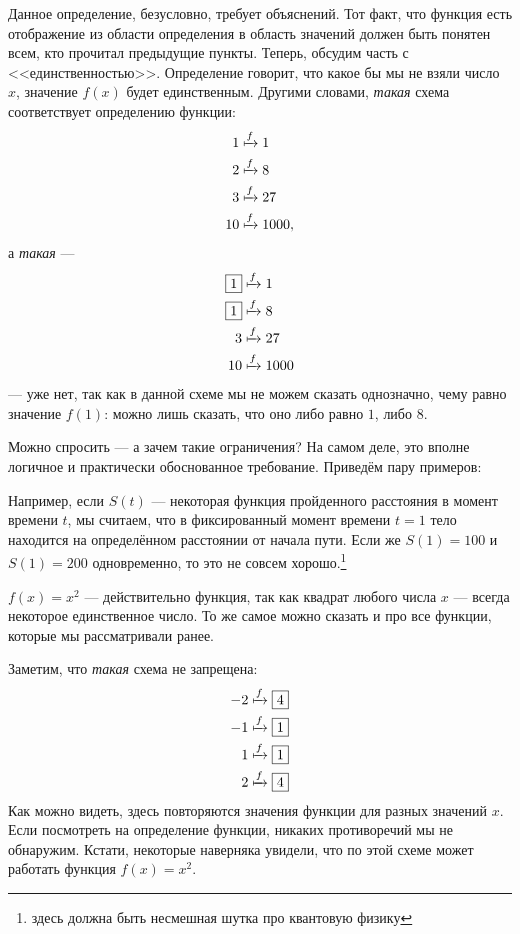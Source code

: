 \documentclass[11pt,fleqn]{book} %
\begin{document}
Данное определение, безусловно, требует объяснений. Тот факт, что функция есть отображение из области определения в область значений должен быть понятен всем, кто прочитал предыдущие пункты. Теперь, обсудим часть с <<единственностью>>. Определение говорит, что какое бы мы не взяли число $x$, значение $f(x)$ будет единственным. Другими словами, \textit{такая} схема соответствует определению функции:
\begin{align*}
1 &\xmapsto{f} 1 \\
2 &\xmapsto{f} 8 \\
3 &\xmapsto{f} 27 \\
10 &\xmapsto{f} 1000,
\end{align*}
а \textit{такая} ---
\begin{align*}
\boxed{1} &\xmapsto{f} 1 \\
\boxed{1} &\xmapsto{f} 8 \\
3 &\xmapsto{f} 27 \\
10 &\xmapsto{f} 1000 
\end{align*}
--- уже нет, так как в данной схеме мы не можем сказать однозначно, чему равно значение $f(1)$: можно лишь сказать, что оно либо равно $1$, либо $8$. 

Можно спросить --- а зачем такие ограничения? На самом деле, это вполне логичное и практически обоснованное требование.  Приведём пару примеров:

\begin{example}
Например, если $S(t)$ --- некоторая функция пройденного расстояния в момент времени $t$, мы считаем, что в  фиксированный момент времени $t=1$ тело находится на определённом расстоянии от начала пути. Если же $S(1)=100$ и $S(1)=200$ одновременно, то это не совсем хорошо.\footnote{здесь должна быть несмешная шутка про квантовую физику} 
\end{example}

\begin{example}
$f(x) = x^2$ --- действительно функция, так как квадрат любого числа $x$ --- всегда некоторое единственное число. То же самое можно сказать и про все функции, которые мы рассматривали ранее. 
\end{example}

\begin{remark}
Заметим, что \emph{такая} схема не запрещена:
\begin{align*}
-2 &\xmapsto{f} \boxed{4} \\
-1 &\xmapsto{f} \boxed{1} \\
1 &\xmapsto{f} \boxed{1} \\
2 &\xmapsto{f} \boxed{4} 
\end{align*}
Как можно видеть, здесь повторяются значения функции для разных значений $x$. Если посмотреть на определение функции, никаких противоречий мы не обнаружим. Кстати, некоторые наверняка увидели, что по этой схеме может работать функция $f(x) = x^2$.
\end{remark}
\end{document}
